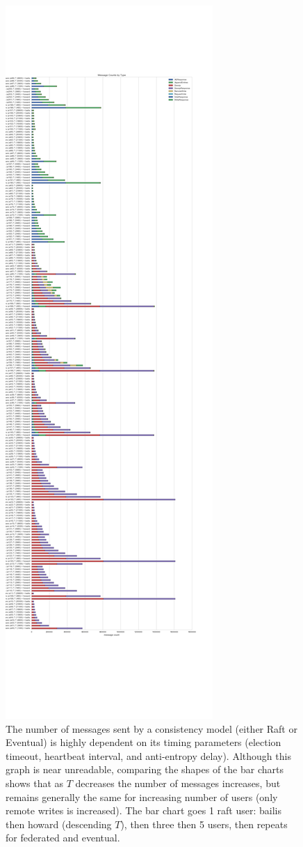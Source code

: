 \documentclass[10pt,letterpaper]{article}
\begin{document}
\begin{figure}[!h]
    \centering
        \includegraphics[height=0.9\textheight]{figures/message_counts.png}
        \caption{\textsf{The number of messages sent by a consistency model (either Raft or Eventual) is highly dependent on its timing parameters (election timeout, heartbeat interval, and anti-entropy delay). Although this graph is near unreadable, comparing the shapes of the bar charts shows that as $T$ decreases the number of messages increases, but remains generally the same for increasing number of users (only remote writes is increased). The bar chart goes 1 raft user: bailis then howard (descending $T$), then three then 5 users, then repeats for federated and eventual. }}
        \label{fig:message_counts}
\end{figure}
\end{document}
